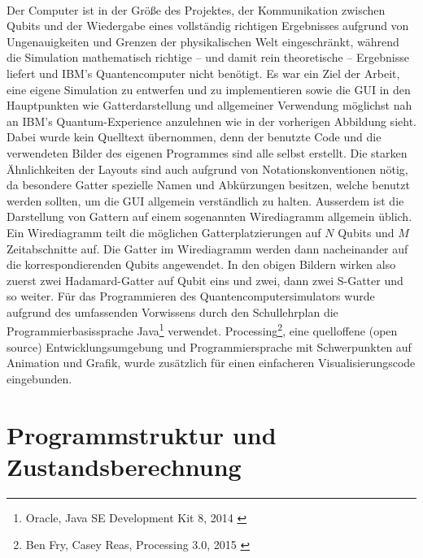 \documentclass[12pt]{report}
\begin{document}
\newpage
\quad \vspace{-0.7cm} \\
Der Computer ist in der Größe des Projektes, der Kommunikation zwischen Qubits und der Wiedergabe eines vollständig richtigen Ergebnisses aufgrund von Ungenauigkeiten und Grenzen der physikalischen Welt eingeschränkt, während die Simulation mathematisch richtige -- und damit rein theoretische -- Ergebnisse liefert und IBM's Quantencomputer nicht benötigt. Es war ein Ziel der Arbeit, eine eigene Simulation zu entwerfen und zu implementieren sowie die GUI in den Hauptpunkten wie Gatterdarstellung und allgemeiner Verwendung möglichst nah an IBM's  \glqq Quantum-Experience\grqq{} anzulehnen wie in der vorherigen Abbildung sieht.
Dabei wurde kein Quelltext übernommen, denn der benutzte Code und die verwendeten Bilder des eigenen Programmes sind alle selbst erstellt. Die starken Ähnlichkeiten der Layouts sind auch aufgrund von Notationskonventionen nötig, da besondere Gatter spezielle Namen und Abkürzungen besitzen, welche benutzt werden sollten, um die GUI allgemein verständlich zu halten. Ausserdem ist die Darstellung von Gattern auf einem sogenannten \glqq Wirediagramm\grqq{} allgemein üblich. Ein Wirediagramm teilt die möglichen Gatterplatzierungen auf $N$ Qubits und $M$ Zeitabschnitte auf. Die Gatter im Wirediagramm werden dann nacheinander auf die korrespondierenden Qubits angewendet. In den obigen Bildern wirken also zuerst zwei Hadamard-Gatter auf Qubit eins und zwei, dann zwei S-Gatter und so weiter.
Für das Programmieren des Quantencomputersimulators wurde aufgrund des umfassenden Vorwissens durch den Schullehrplan die Programmierbasissprache Java\footnote{Oracle, Java SE Development Kit 8, 2014 \cite{p4-2}} verwendet. Processing\footnote{Ben Fry, Casey Reas, Processing 3.0, 2015 \cite{p4-3}}, eine quelloffene (open source) Entwicklungsumgebung und Programmiersprache mit Schwerpunkten auf Animation und Grafik, wurde zusätzlich für einen einfacheren Visualisierungscode eingebunden.

\section{Programmstruktur und Zustandsberechnung}
\end{document}
